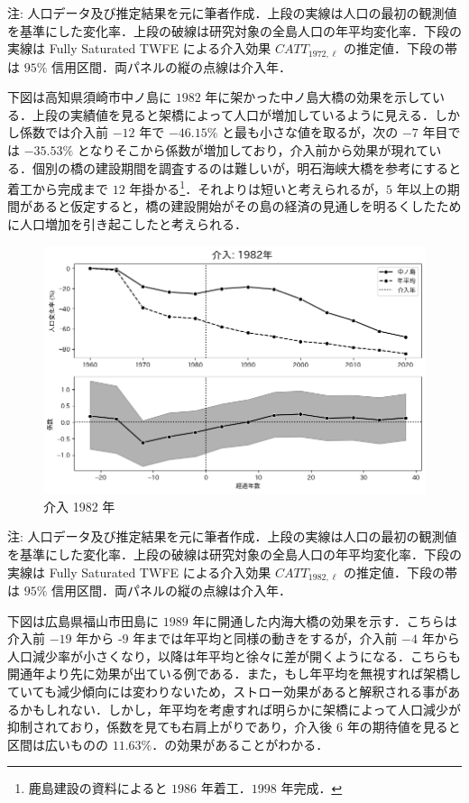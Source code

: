 注:
人口データ及び推定結果を元に筆者作成．上段の実線は人口の最初の観測値を基準にした変化率．上段の破線は研究対象の全島人口の年平均変化率．下段の実線は
Fully Saturated TWFE による介入効果 \(CATT_{1972, \ell}\)
の推定値．下段の帯は \(95\%\) 信用区間．両パネルの縦の点線は介入年．

下図は高知県須崎市中ノ島に \(1982\)
年に架かった中ノ島大橋の効果を示している．上段の実績値を見ると架橋によって人口が増加しているように見える．しかし係数では介入前
\(-12\) 年で \(-46.15\%\) と最も小さな値を取るが，次の \(-7\) 年目では
\(-35.53\%\)
となりそこから係数が増加しており，介入前から効果が現れている．個別の橋の建設期間を調査するのは難しいが，明石海峡大橋を参考にすると着工から完成まで
\(12\) 年掛かる\footnote{鹿島建設の資料によると \(1986\)
  年着工．\(1998\) 年完成．}．それよりは短いと考えられるが，\(5\)
年以上の期間があると仮定すると，橋の建設開始がその島の経済の見通しを明るくしたために人口増加を引き起こしたと考えられる．

\begin{figure}
\centering
\includegraphics{../figures/fully_saturated_twfe/1982.png}
\caption{介入 1982 年}
\end{figure}

注:
人口データ及び推定結果を元に筆者作成．上段の実線は人口の最初の観測値を基準にした変化率．上段の破線は研究対象の全島人口の年平均変化率．下段の実線は
Fully Saturated TWFE による介入効果 \(CATT_{1982, \ell}\)
の推定値．下段の帯は \(95\%\) 信用区間．両パネルの縦の点線は介入年．

下図は広島県福山市田島に \(1989\)
年に開通した内海大橋の効果を示す．こちらは介入前 \(-19\) 年から \(‐9\)
年までは年平均と同様の動きをするが，介入前 \(-4\)
年から人口減少率が小さくなり，以降は年平均と徐々に差が開くようになる．こちらも開通年より先に効果が出ている例である．また，もし年平均を無視すれば架橋していても減少傾向には変わりないため，ストロー効果があると解釈される事があるかもしれない．しかし，年平均を考慮すれば明らかに架橋によって人口減少が抑制されており，係数を見ても右肩上がりであり，介入後
\(6\) 年の期待値を見ると区間は広いものの
\(11.63\%\)．の効果があることがわかる．


